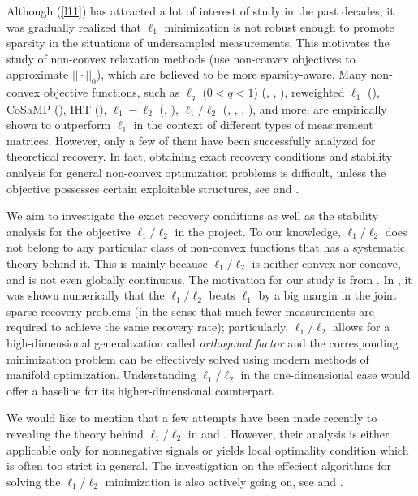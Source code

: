 \documentclass[11pt]{article}
\numberwithin{equation}{section}
\theoremstyle{plain}
\theoremstyle{definition}
\begin{document}
Although (\ref{l11}) has attracted a lot of interest of study in the past decades, it was gradually realized that $\ell_1$ minimization is not robust enough to promote sparsity in the situations of undersampled measurements. This motivates the study of non-convex relaxation methods (use non-convex objectives to approximate $|| \cdot||_0$), which are believed to be more sparsity-aware. Many non-convex objective functions, such as $\ell_q$ ($0<q<1$) (\cite{gribonval2007highly}, \cite{chartrand2007exact}, \cite{foucart2009sparsest}), reweighted $\ell_1$ (\cite{candes2008enhancing}), CoSaMP (\cite{needell2009cosamp}), IHT (\cite{blumensath2009iterative}), $\ell_1-\ell_2$ (\cite{yin2014ratio}, \cite{yin2015minimization}), $\ell_1/\ell_2$ (\cite{hoyer2002non}, \cite{hurley2009comparing}, \cite{yin2014ratio},  \cite{rahimi2018scale}), and more, are empirically shown to outperform $\ell_1$ in the context of different types of measurement matrices. However, only a few of them have been successfully analyzed for theoretical recovery. In fact, obtaining exact recovery conditions and stability analysis for general non-convex optimization problems is difficult, unless the objective possesses certain exploitable structures, see \cite{lv2009unified} and \cite{tran2017unified}. 

We aim to investigate the exact recovery conditions as well as the stability analysis for the objective $\ell_1/\ell_2$ in the project. To our knowledge, $\ell_1/\ell_2$ does not belong to any particular class of non-convex functions that has a systematic theory behind it. This is mainly because $\ell_1/\ell_2$ is neither convex nor concave, and is not even globally continuous. The motivation for our study is from  \cite{petrosyan2019reconstruction}.  In \cite{petrosyan2019reconstruction}, it was shown numerically that the $\ell_1/\ell_2$ beats $\ell_1$ by a big margin in the joint sparse recovery problems (in the sense that much fewer measurements are required to achieve the same recovery rate); particularly, $\ell_1/\ell_2$ allows for a high-dimensional generalization called \emph{orthogonal factor} and the corresponding minimization problem can be effectively solved using modern methods of manifold optimization. Understanding $\ell_1/\ell_2$ in the one-dimensional case would offer a baseline for its higher-dimensional counterpart. 

We would like to mention that a few attempts have been made recently to revealing the theory behind $\ell_1/\ell_2$ in \cite{yin2014ratio} and \cite{rahimi2018scale}. However, their analysis is either applicable only for nonnegative signals or yields local optimality condition which is often too strict in general. The investigation on the effecient algorithms for solving the $\ell_1/\ell_2$ minimization is also actively going on, see \cite{rahimi2018scale} and \cite{wang2019accelerated}. 
\end{document}
